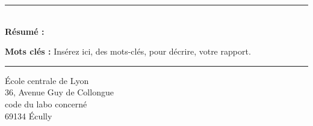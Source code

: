 \documentclass[a4paper,12pt,french]{article}
\begin{document}
%
%



\newpage
\thispagestyle{empty}

\vspace*{\fill}
\noindent\rule[2pt]{\textwidth}{0.5pt}\\
{\textbf{Résumé :}}
\lipsum[1]

{\noindent\textbf{Mots clés :}}
Insérez ici, des mots-clés, pour décrire, votre rapport.
\\
\noindent\rule[2pt]{\textwidth}{0.5pt}
\begin{center}
  École centrale de Lyon\\
  36, Avenue Guy de Collongue\\
  code du labo concerné\\
  69134 Écully
\end{center}
\vspace*{\fill}
\end{document}
